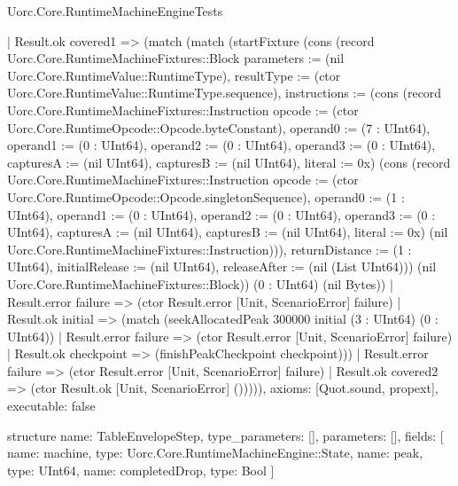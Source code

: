 \begin{lexlean}{Uorc.Core.RuntimeMachineEngineTests}
\begin{semanticmodule}
{      | Result.ok covered1 => (match (match (startFixture (cons (record Uorc.Core.RuntimeMachineFixtures::Block {parameters := (nil Uorc.Core.RuntimeValue::RuntimeType), resultType := (ctor Uorc.Core.RuntimeValue::RuntimeType.sequence), instructions := (cons (record Uorc.Core.RuntimeMachineFixtures::Instruction {opcode := (ctor Uorc.Core.RuntimeOpcode::Opcode.byteConstant), operand0 := (7 : UInt64), operand1 := (0 : UInt64), operand2 := (0 : UInt64), operand3 := (0 : UInt64), capturesA := (nil UInt64), capturesB := (nil UInt64), literal := 0x}) (cons (record Uorc.Core.RuntimeMachineFixtures::Instruction {opcode := (ctor Uorc.Core.RuntimeOpcode::Opcode.singletonSequence), operand0 := (1 : UInt64), operand1 := (0 : UInt64), operand2 := (0 : UInt64), operand3 := (0 : UInt64), capturesA := (nil UInt64), capturesB := (nil UInt64), literal := 0x}) (nil Uorc.Core.RuntimeMachineFixtures::Instruction))), returnDistance := (1 : UInt64), initialRelease := (nil UInt64), releaseAfter := (nil (List UInt64))}) (nil Uorc.Core.RuntimeMachineFixtures::Block)) (0 : UInt64) (nil Bytes))
          | Result.error failure => (ctor Result.error [Unit, ScenarioError] failure)
          | Result.ok initial => (match (seekAllocatedPeak 300000 initial (3 : UInt64) (0 : UInt64))
            | Result.error failure => (ctor Result.error [Unit, ScenarioError] failure)
            | Result.ok checkpoint => (finishPeakCheckpoint checkpoint)))
        | Result.error failure => (ctor Result.error [Unit, ScenarioError] failure)
        | Result.ok covered2 => (ctor Result.ok [Unit, ScenarioError] ())))),
  axioms: [Quot.sound, propext],
  executable: false
}

structure{
  name: TableEnvelopeStep,
  type_parameters: [],
  parameters: [],
  fields: [
    {name: machine, type: Uorc.Core.RuntimeMachineEngine::State},
    {name: peak, type: UInt64},
    {name: completedDrop, type: Bool}
  ]
}


\end{semanticmodule}
\end{lexlean}
